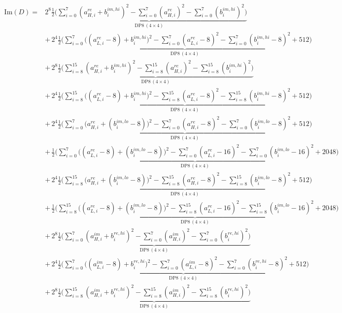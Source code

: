 \documentclass[fleqn]{article}
\newcommand{\DPop}[3]{\mathrm{DP#1}\,(#2\!\times\!#3)}
\begin{document}
\begin{align*}
\mathrm{Im}(D) = {}
  & 2^{8}\underbrace{\tfrac12\Big(\sum_{i=0}^{7}(a_{H,i}^{re}{+}b_i^{im,hi})^2 - \sum_{i=0}^{7}(a_{H,i}^{re})^2 - \sum_{i=0}^{7}(b_i^{im,hi})^2\Big)}_{\DPop{8}{4}{4}} \\[0.6em]
  & +\, 2^{4}\underbrace{\tfrac12\Big(\sum_{i=0}^{7}\big((a_{L,i}^{re}{-}8){+}b_i^{im,hi}\big)^2 - \sum_{i=0}^{7}(a_{L,i}^{re}{-}8)^2 - \sum_{i=0}^{7}(b_i^{im,hi}{-}8)^2 + 512\Big)}_{\DPop{8}{4}{4}} \\[0.6em]
  & +\, 2^{8}\underbrace{\tfrac12\Big(\sum_{i=8}^{15}(a_{H,i}^{re}{+}b_i^{im,hi})^2 - \sum_{i=8}^{15}(a_{H,i}^{re})^2 - \sum_{i=8}^{15}(b_i^{im,hi})^2\Big)}_{\DPop{8}{4}{4}} \\[0.6em]
  & +\, 2^{4}\underbrace{\tfrac12\Big(\sum_{i=8}^{15}\big((a_{L,i}^{re}{-}8){+}b_i^{im,hi}\big)^2 - \sum_{i=8}^{15}(a_{L,i}^{re}{-}8)^2 - \sum_{i=8}^{15}(b_i^{im,hi}{-}8)^2 + 512\Big)}_{\DPop{8}{4}{4}} \\[0.6em]
  & +\, 2^{4}\underbrace{\tfrac12\Big(\sum_{i=0}^{7}\big(a_{H,i}^{re}{+}(b_i^{im,lo}{-}8)\big)^2 - \sum_{i=0}^{7}(a_{H,i}^{re}{-}8)^2 - \sum_{i=0}^{7}(b_i^{im,lo}{-}8)^2 + 512\Big)}_{\DPop{8}{4}{4}} \\[0.6em]
  & +\, \underbrace{\tfrac12\Big(\sum_{i=0}^{7}\big((a_{L,i}^{re}{-}8){+}(b_i^{im,lo}{-}8)\big)^2 - \sum_{i=0}^{7}(a_{L,i}^{re}{-}16)^2 - \sum_{i=0}^{7}(b_i^{im,lo}{-}16)^2 + 2048\Big)}_{\DPop{8}{4}{4}} \\[0.6em]
  & +\, 2^{4}\underbrace{\tfrac12\Big(\sum_{i=8}^{15}\big(a_{H,i}^{re}{+}(b_i^{im,lo}{-}8)\big)^2 - \sum_{i=8}^{15}(a_{H,i}^{re}{-}8)^2 - \sum_{i=8}^{15}(b_i^{im,lo}{-}8)^2 + 512\Big)}_{\DPop{8}{4}{4}} \\[0.6em]
  & +\, \underbrace{\tfrac12\Big(\sum_{i=8}^{15}\big((a_{L,i}^{re}{-}8){+}(b_i^{im,lo}{-}8)\big)^2 - \sum_{i=8}^{15}(a_{L,i}^{re}{-}16)^2 - \sum_{i=8}^{15}(b_i^{im,lo}{-}16)^2 + 2048\Big)}_{\DPop{8}{4}{4}} \\[0.6em]
  & +\, 2^{8}\underbrace{\tfrac12\Big(\sum_{i=0}^{7}(a_{H,i}^{im}{+}b_i^{re,hi})^2 - \sum_{i=0}^{7}(a_{H,i}^{im})^2 - \sum_{i=0}^{7}(b_i^{re,hi})^2\Big)}_{\DPop{8}{4}{4}} \\[0.6em]
  & +\, 2^{4}\underbrace{\tfrac12\Big(\sum_{i=0}^{7}\big((a_{L,i}^{im}{-}8){+}b_i^{re,hi}\big)^2 - \sum_{i=0}^{7}(a_{L,i}^{im}{-}8)^2 - \sum_{i=0}^{7}(b_i^{re,hi}{-}8)^2 + 512\Big)}_{\DPop{8}{4}{4}} \\[0.6em]
  & +\, 2^{8}\underbrace{\tfrac12\Big(\sum_{i=8}^{15}(a_{H,i}^{im}{+}b_i^{re,hi})^2 - \sum_{i=8}^{15}(a_{H,i}^{im})^2 - \sum_{i=8}^{15}(b_i^{re,hi})^2\Big)}_{\DPop{8}{4}{4}} \\[0.6em]

\end{align*}
\end{document}
